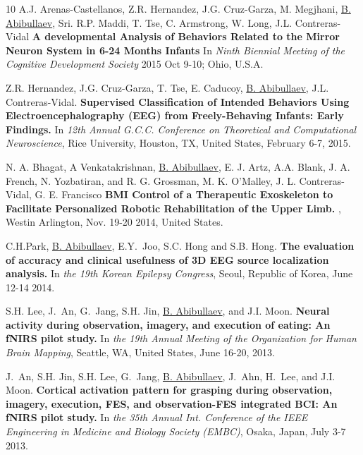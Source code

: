 \documentclass[10pt,letterpaper,sans]{moderncv}   %
\begin{document}
\begin{thebibliography}{10}
A.J. Arenas-Castellanos, Z.R. Hernandez, J.G. Cruz-Garza, M. Megjhani, \underline{B. Abibullaev}, Sri. R.P. Maddi, T. Tse,  C. Armstrong, W. Long, J.L. Contreras-Vidal
\newblock \textbf{A developmental Analysis of Behaviors Related to the Mirror Neuron System in 6-24 Months Infants}
\newblock In {\em Ninth Biennial Meeting of the Cognitive Development Society} 2015 Oct 9-10; Ohio, U.S.A.

Z.R. Hernandez, J.G. Cruz-Garza, T. Tse, E. Caducoy, \underline{B. Abibullaev}, J.L. Contreras-Vidal.
\newblock \textbf{Supervised Classification of Intended Behaviors Using Electroencephalography ({EEG}) from Freely-Behaving Infants: Early Findings.}
\newblock In {\em 12th Annual G.C.C. Conference on Theoretical and Computational Neuroscience}, Rice University, Houston, TX, United States, February 6-7, 2015.

N. A. Bhagat, A Venkatakrishnan, \underline{B. Abibullaev}, E. J. Artz, A.A. Blank, J. A. French, N. Yozbatiran, and R. G. Grossman, M. K. O'Malley, J. L. Contreras-Vidal, G. E. Francisco
\newblock \textbf{{BMI} Control of a Therapeutic Exoskeleton to Facilitate Personalized Robotic Rehabilitation of the Upper Limb.} 
, Westin Arlington, Nov. 19-20 2014, United States.  

C.H.Park,  \underline{B. Abibullaev}, E.Y.~Joo, S.C. Hong and S.B. Hong.
\newblock \textbf{The evaluation of accuracy and clinical usefulness of 3D {EEG} source localization analysis.}
\newblock In {\em the 19th Korean Epilepsy Congress}, Seoul, Republic of Korea, June 12-14 2014.

S.H. Lee, J.~An, G.~Jang, S.H. Jin, \underline{B. Abibullaev}, and J.I. Moon.
\newblock \textbf{Neural activity during observation, imagery, and execution of eating: An {fNIRS} pilot study.}
\newblock In {\em the 19th Annual Meeting of the Organization for Human Brain
  Mapping}, Seattle, WA, United States, June 16-20, 2013.

J.~An, S.H. Jin, S.H. Lee, G.~Jang, \underline{B. Abibullaev}, J.~Ahn, H.~Lee, and J.I. Moon.
\newblock \textbf{Cortical activation pattern for grasping during observation, imagery, execution, {FES}, and observation-{FES} integrated {BCI}: An {fNIRS} pilot study.}
\newblock In {\em the 35th Annual Int. Conference of the {IEEE} Engineering in Medicine and Biology Society (EMBC)}, Osaka, Japan, July 3-7 2013.


\end{thebibliography}
\end{document}
